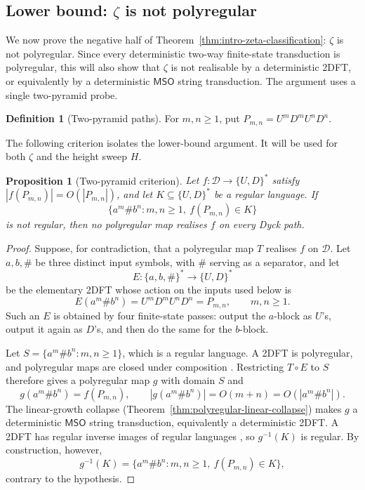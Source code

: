 \documentclass[11pt]{article}
\newtheorem{proposition}[theorem]{Proposition}
\theoremstyle{definition}
\newtheorem{definition}[theorem]{Definition}
\newcommand{\D}{\mathcal D}
\newcommand{\MSO}{\mathsf{MSO}}
\begin{document}
\subsection[Lower bound: zeta is not polyregular]{Lower bound: $\zeta$ is not polyregular}\label{sec:zeta-not-polyregular}

We now prove the negative half of Theorem~\ref{thm:intro-zeta-classification}:
$\zeta$ is not polyregular.  Since every deterministic two-way finite-state
transduction is polyregular, this will also show that $\zeta$ is not realisable
by a deterministic 2DFT, or equivalently by a deterministic $\MSO$ string
transduction.  The argument uses a single two-pyramid probe.

\begin{definition}[Two-pyramid paths]
For $m,n\ge 1$, put $P_{m,n}=U^m D^m U^n D^n$.
\end{definition}

The following criterion isolates the lower-bound argument.  It will be used
for both $\zeta$ and the height sweep $H$.

\begin{proposition}[Two-pyramid criterion]
\label{prop:two-pyramid-criterion}
Let $f\colon\D\to\{U,D\}^*$ satisfy
$|f(P_{m,n})|=O(|P_{m,n}|)$, and let
$K\subseteq\{U,D\}^*$ be a regular language.  If
\[
   \{a^m\#b^n:m,n\ge1,\ f(P_{m,n})\in K\}
\]
is not regular, then no polyregular map realises $f$ on every Dyck path.
\end{proposition}

\begin{proof}
Suppose, for contradiction, that a polyregular map $T$ realises $f$ on
$\D$.  Let $a,b,\#$ be three distinct input symbols, with $\#$ serving as a
separator, and let
\[
   E\colon\{a,b,\#\}^*\longrightarrow\{U,D\}^*
\]
be the elementary 2DFT whose action on the inputs used below is
\[
   E(a^m\#b^n)=U^mD^mU^nD^n=P_{m,n},\qquad m,n\ge1.
\]
Such an $E$ is obtained by four finite-state passes: output the $a$-block as
$U$'s, output it again as $D$'s, and then do the same for the $b$-block.

Let $S=\{a^m\#b^n:m,n\ge1\}$, which is a regular language.  A 2DFT is
polyregular, and polyregular maps are closed under composition
\cite{Bojanczyk2018}.  Restricting $T\circ E$ to $S$ therefore gives a
polyregular map $g$ with domain $S$ and
\[
   g(a^m\#b^n)=f(P_{m,n}),\qquad
   |g(a^m\#b^n)|=O(m+n)=O(|a^m\#b^n|).
\]
The linear-growth collapse
(Theorem~\ref{thm:polyregular-linear-collapse}) makes $g$ a deterministic
$\MSO$ string transduction, equivalently a deterministic 2DFT.  A 2DFT has
regular inverse images of regular languages
\cite{EngelfrietHoogeboom2001}, so $g^{-1}(K)$ is regular.  By construction,
however,
\[
   g^{-1}(K)=\{a^m\#b^n:m,n\ge1,\ f(P_{m,n})\in K\},
\]
contrary to the hypothesis.
\end{proof}
\end{document}
